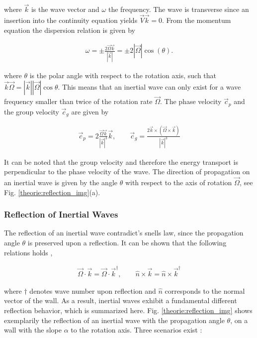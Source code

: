 where $\vec{k}$ is the wave vector and $\omega$ the frequency.
The wave is transverse since an insertion into the continuity equation yields $\vec{V}\vec{k} = 0$.
From the momentum equation the dispersion relation is given by

\begin{align}
    \label{theorie:eq_rot_dispersion}
    \omega = \pm \frac{ 2\vec{\Omega}\vec{k}}{|\vec{k}|} = \pm 2|\vec{\Omega}|\cos(\theta).
\end{align}

where $\theta$ is the polar angle with respect to the rotation axis,
such that $\vec{k}\vec{\Omega} = |\vec{k}||\vec{\Omega}|\cos{\theta}$.
This means that an inertial wave can only exist for a wave frequency smaller than twice of the rotation rate $\vec{\Omega}$.
The phase velocity $\vec{c}_p$ and the group velocity $\vec{c}_g$ are given by

\begin{align}
    \vec{c}_p = 2 \frac{\vec{\Omega} \vec{k} }{|\vec{k}|^3} \vec{k}, \qquad
    \vec{c}_g = \frac{2 \vec{k} \times (\vec{\Omega} \times \vec{k})}{|\vec{k}|^3}
\end{align}

\clearpage


It can be noted that the group velocity and therefore the energy transport is perpendicular to the phase velocity of the wave.
The direction of propagation on an inertial wave is given by the angle $\theta$ with respect to the axis of rotation $\vec{\Omega}$,
see Fig. \ref{theorie:reflection_img}(a).


\subsubsection{Reflection of Inertial Waves}
\label{theorie:sec:iwreflec}

The reflection of an inertial wave contradict's snells law, since the propagation angle $\theta$ is preserved upon a reflection.
It can be shown that the following relations holds \cite{Beardsley1970},

\begin{align}
\label{theorie:reflections}
\vec{\Omega}\cdot \vec{k} =  \vec{\Omega}\cdot\vec{k}^\dagger, \qquad \hat{n} \times \vec{k} = \hat{n} \times \vec{k}^\dagger
\end{align}

where $\dagger$ denotes wave number upon reflection and $\hat{n}$ corresponds to the normal vector of the wall.
As a result, inertial waves exhibit a fundamental different reflection behavior, which is summarized here.
Fig. \ref{theorie:reflection_img} shows exemplarily the reflection of an inertial wave with the propagation angle $\theta$,
on a wall with the slope $\alpha$ to the rotation axis. Three scenarios exist \citep{Clausen2011}:

